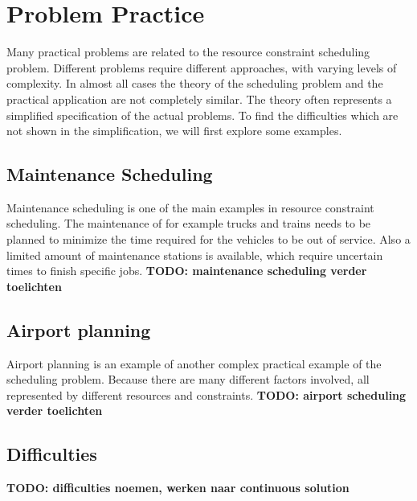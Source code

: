 \documentclass{article}
\newcommand{\TODO}[1]{{\color{red}\textbf{TODO: #1}}}
\begin{document}
\newpage

\section{Problem Practice}
Many practical problems are related to the resource constraint scheduling problem.
Different problems require different approaches, with varying levels of complexity.
In almost all cases the theory of the scheduling problem and the practical application are not completely similar.
The theory often represents a simplified specification of the actual problems.
To find the difficulties which are not shown in the simplification, we will first explore some examples.

\subsection{Maintenance Scheduling}
Maintenance scheduling is one of the main examples in resource constraint scheduling.
The maintenance of for example trucks and trains needs to be planned to minimize the time required for the vehicles to be out of service.
Also a limited amount of maintenance stations is available, which require uncertain times to finish specific jobs.
\TODO{maintenance scheduling verder toelichten}

\subsection{Airport planning}
Airport planning is an example of another complex practical example of the scheduling problem.
Because there are many different factors involved, all represented by different resources and constraints.
\TODO{airport scheduling verder toelichten}

\subsection{Difficulties}
\TODO{difficulties noemen, werken naar continuous solution}


\end{document}

